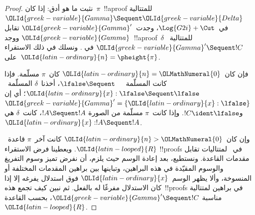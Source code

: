 \documentclass[../../../include/open-logic-section]{subfiles}
\begin{document}
\begin{proof}
  نثبت ما هو أدق: إذا كان~$\pi$~!!a{proof} للمتتالية
  $\OLId{greek-variable}{Gamma} \Sequent \OLId{greek-variable}{Delta}$ في~$\Log{G2i}+\Cut$، وجدت~$\OLId{greek-variable}{Gamma}'$ تقابل
  $\OLId{greek-variable}{Gamma}$ ووجد~!!a{proof}~$\delta$ للمتتالية~$\OLId{greek-variable}{Gamma}' \Sequent !C$ في
  . ونسلك في ذلك الاستقراء على~$\OLId{latin-ordinary}{n} = \pheight{\pi}$.

  فإن كان~$\OLId{latin-ordinary}{n} = \OLMathNumeral{0}$ كان~$\pi$ مسلّمة. فإذا كانت المسلّمة~$\lfalse \Sequent
  \quad$، أخذنا~$\delta$ المسلّمة~$\OLId{latin-ordinary}{x}:\lfalse \Sequent \lfalse$؛ أي إن
  $\OLId{greek-variable}{Gamma}' = \{\OLId{latin-ordinary}{x}:\lfalse\}$ و$!C \ident \lfalse$. وإذا كانت~$\pi$ مسلّمة
  من الصورة $!A \Sequent !A$، كانت~$\delta$ هي $\OLId{latin-ordinary}{x}: !A \Sequent !A$.
  
  وإن كان~$\OLId{latin-ordinary}{n}>\OLMathNumeral{0}$ كانت آخر~$\pi$ قاعدة~$\OLId{latin-looped}{R}$. ويعطينا فرض الاستقراء
  !!{proof}s في~ لمتتاليات تقابل مقدمات القاعدة. ونستطيع، بعد
  إعادة الوسم حيث يلزم، أن نفرض تميز وسوم التفريغ والوسوم المقيّدة في هذه
  البراهين، وتباينها بين براهين المقدمات المختلفة أو المنسوخة، وألا يظهر
  الوسم~$\OLId{latin-ordinary}{x}$ فوق استدلال يفرغه إلا إذا كان الاستدلال مفرغًا له بالفعل.
  ثم نبين كيف تجمع هذه~!!{proof}s في براهين لمتتالية مناسبة
  $\OLId{greek-variable}{Gamma}' \Sequent !C$، بحسب القاعدة~$\OLId{latin-looped}{R}$.


\end{proof}
\end{document}
